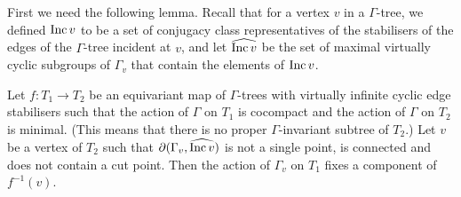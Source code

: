 First we need the following lemma. Recall that for a vertex $v$ in a
$\Gamma$-tree, we defined $\operatorname{\mathrm{Inc}} v$ to be a set of conjugacy class
representatives of the stabilisers of the edges of the $\Gamma$-tree incident
at $v$, and let $\widehat{\operatorname{\mathrm{Inc}} v}$ be the set of maximal virtually cyclic
subgroups of $\Gamma_v$ that contain the elements of $\operatorname{\mathrm{Inc}} v$.

\begin{lem}\label{lem:fixedcomponent} Let $f \colon T_1 \to T_2$ be an
  equivariant map of $\Gamma$-trees with virtually infinite cyclic edge
  stabilisers such that the action of $\Gamma$ on $T_1$ is cocompact and the
  action of $\Gamma$ on $T_2$ is minimal.  (This means that there is no proper
  $\Gamma$-invariant subtree of $T_2$.) Let $v$ be a vertex of $T_2$ such that
  $\partial(\Gamma_v, \widehat{\operatorname{\mathrm{Inc}} v})$ is not a single point, is connected
  and does not contain a cut point. Then the action of $\Gamma_v$ on $T_1$
  fixes a component of $f^{-1}(v)$.\end{lem}

